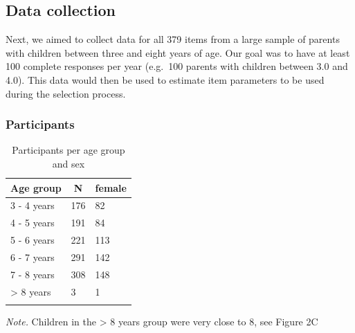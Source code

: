 \documentclass[
  man,floatsintext]{apa6}
\begin{document}
\hypertarget{data-collection}{%
\subsection{Data collection}\label{data-collection}}

Next, we aimed to collect data for all 379 items from a large sample of parents with children between three and eight years of age. Our goal was to have at least 100 complete responses per year (e.g.~100 parents with children between 3.0 and 4.0). This data would then be used to estimate item parameters to be used during the selection process.

\hypertarget{participants}{%
\subsubsection{Participants}\label{participants}}

\begin{table}[tbp]

\begin{center}
\begin{threeparttable}

\caption{\label{tab:tab1}Participants per age group and sex}

\begin{tabular}{lll}
\toprule
Age group & \multicolumn{1}{c}{N} & \multicolumn{1}{c}{female}\\
\midrule
3 - 4 years & 176 & 82\\
4 - 5 years & 191 & 84\\
5 - 6 years & 221 & 113\\
6 - 7 years & 291 & 142\\
7 - 8 years & 308 & 148\\
> 8 years & 3 & 1\\
\bottomrule
\addlinespace
\end{tabular}

\begin{tablenotes}[para]
\normalsize{\textit{Note.} Children in the > 8 years group were very close to 8, see Figure 2C}
\end{tablenotes}

\end{threeparttable}
\end{center}

\end{table}
\end{document}
